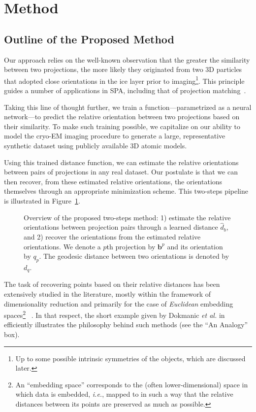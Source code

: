 \section{Method}

\subsection{Outline of the Proposed Method}

Our approach relies on the well-known observation that the greater the similarity between two projections, the more likely they originated from two 3D particles that adopted close orientations in the ice layer prior to imaging\footnote{Up to some possible intrinsic symmetries of the objects, which are discussed later.}. This principle guides a number of applications in SPA, including that of projection matching~\cite{penczek1994ribosome}.

Taking this line of thought further, we train a function---parametrized as a neural network---to predict the relative orientation between two projections based on their similarity. To make such training possible, we capitalize on our ability to model the cryo-EM imaging procedure to generate a large, representative synthetic dataset using publicly available 3D atomic models.

Using this trained distance function, we can estimate the relative orientations between pairs of projections in any real dataset. Our postulate is that we can then recover, from these estimated relative orientations, the orientations themselves through an appropriate minimization scheme. This two-steps pipeline is illustrated in Figure~\ref{fig:overview-pipeline}.

\begin{figure}[h!]
    \center
    \caption{Overview of the proposed two-steps method: 1) estimate the relative orientations between projection pairs through a learned distance $\widehat{d}_b$, and 2) recover the orientations from the estimated relative orientations. We denote a $p$th projection by $\mathbf{b}^p$ and its orientation by $q_p$. The geodesic distance between two orientations is denoted by $d_q$.}
    \label{fig:overview-pipeline}
\end{figure}

The task of recovering points based on their relative distances has been extensively studied in the literature, mostly within the framework of dimensionality reduction and primarily for the case of \textit{Euclidean} embedding spaces\footnote{An ``embedding space'' corresponds to the (often lower-dimensional) space in which data is embedded, \textit{i.e.}, mapped to in such a way that the relative distances between its points are preserved as much as possible.}~\cite{belkin2003laplacian,kruskal1978multidimensional, maaten2008visualizing, mcinnes2018umap,dokmanic2015euclidean} . In that respect, the short example given by Dokmanic \textit{et al.} in~\cite{dokmanic2015euclidean} efficiently illustrates the philosophy behind such methods (see the ``An Analogy'' box).

